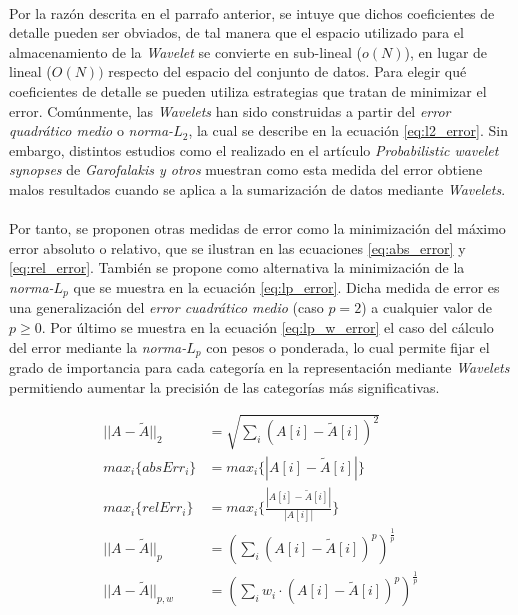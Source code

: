 \documentclass{subfiles}
\begin{document}
        \paragraph{}
        Por la razón descrita en el parrafo anterior, se intuye que dichos coeficientes de detalle pueden ser obviados, de tal manera que el espacio utilizado para el almacenamiento de la \emph{Wavelet} se convierte en sub-lineal ($o(N)$), en lugar de lineal ($O(N))$ respecto del espacio del conjunto de datos. Para elegir qué coeficientes de detalle se pueden utiliza estrategias que tratan de minimizar el error. Comúnmente, las \emph{Wavelets} han sido construidas a partir del \emph{error quadrático medio} o \emph{norma-$L_2$}, la cual se describe en la ecuación \eqref{eq:l2_error}. Sin embargo, distintos estudios como el realizado en el artículo \emph{Probabilistic wavelet synopses} \cite{garofalakis2004probabilistic} de \emph{Garofalakis y otros} muestran como esta medida del error obtiene malos resultados cuando se aplica a la sumarización de datos mediante \emph{Wavelets}.

        \paragraph{}
        Por tanto, se proponen otras medidas de error como la minimización del máximo error absoluto o relativo, que se ilustran en las ecuaciones \eqref{eq:abs_error} y \eqref{eq:rel_error}. También se propone como alternativa la minimización de la \emph{norma-$L_p$} que se muestra en la ecuación \eqref{eq:lp_error}. Dicha medida de error es una generalización del \emph{error cuadrático medio} (caso $p=2$) a cualquier valor de $p \geq 0$. Por último se muestra en la ecuación \eqref{eq:lp_w_error} el caso del cálculo del error mediante la \emph{norma-$L_p$} con pesos o ponderada, lo cual permite fijar el grado de importancia para cada categoría en la representación mediante \emph{Wavelets} permitiendo aumentar la precisión de las categorías más significativas.

        \begin{align}
        \label{eq:l2_error}
          ||A - \widetilde{A} ||_2  &= \sqrt{\sum_{i}(A[i]-\widetilde{A}[i])^2} \\
        \label{eq:abs_error}
          max_i\{absErr_i\} &= max_i\{|A[i]-\widetilde{A}[i]|\} \\
        \label{eq:rel_error}
          max_i\{relErr_i\} &= max_i\bigg\{\frac{|A[i]-\widetilde{A}[i]|}{|A[i]|} \bigg\} \\
        \label{eq:lp_error}
          ||A - \widetilde{A} ||_{p}  &= (\sum_{i}(A[i]-\widetilde{A}[i])^p)^{\frac{1}{p}} \\
        \label{eq:lp_w_error}
          ||A - \widetilde{A} ||_{p,w}  &= (\sum_{i}w_i \cdot(A[i]-\widetilde{A}[i])^p)^{\frac{1}{p}}
        \end{align}
\end{document}
